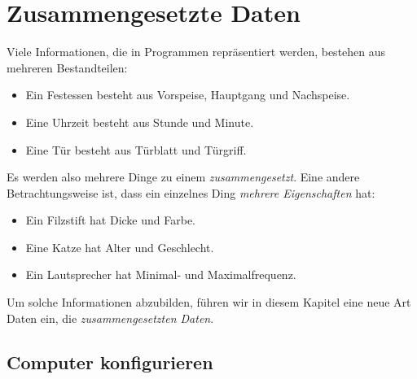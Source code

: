 
\chapter{Zusammengesetzte Daten}
\label{cha:zusammengesetzte-daten}

Viele Informationen, die in Programmen repräsentiert werden, bestehen
aus mehreren Bestandteilen:
%
\begin{itemize}
\item Ein Festessen besteht aus Vorspeise, Hauptgang und Nachspeise.
\item Eine Uhrzeit besteht aus Stunde und Minute.
\item Eine Tür besteht aus Türblatt und Türgriff.
\end{itemize}
%
Es werden also mehrere Dinge zu einem \textit{zusammengesetzt}.
Eine andere Betrachtungsweise ist, dass ein einzelnes
Ding \textit{mehrere Eigenschaften} hat:
%
\begin{itemize}
\item Ein Filzstift hat Dicke und Farbe.
\item Eine Katze hat Alter und Geschlecht.
\item Ein Lautsprecher hat Minimal- und Maximalfrequenz.
\end{itemize}
%
Um solche Informationen abzubilden, führen wir in diesem Kapitel eine neue Art
Daten ein, die \textit{zusammengesetzten
  Daten}.

\section{Computer konfigurieren}
\label{sec:computer-konfigurieren}

